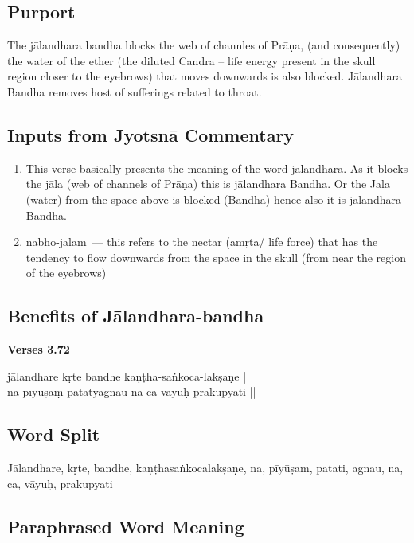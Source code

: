 \subsection*{Purport}

The jālandhara bandha blocks the web of channles of Prāṇa, (and consequently) the water of the ether (the diluted Candra – life energy present in the skull region closer to the eyebrows) that moves downwards is also blocked. Jālandhara Bandha removes host of sufferings related to throat.

\subsection*{Inputs from Jyotsnā Commentary}

\begin{enumerate}
\item This verse basically presents the meaning of the word jālandhara. As it blocks the jāla (web of channels of Prāṇa) this is jālandhara Bandha. Or the Jala (water) from the space above is blocked (Bandha) hence also it is jālandhara Bandha.
\item nabho-jalam --- this refers to the nectar (amṛta/ life force) that has the tendency to flow downwards from the space in the skull (from near the region of the eyebrows)
\end{enumerate}

\subsection*{Benefits of Jālandhara-bandha}

\noindent \textbf{Verses 3.72}

\begin{shloka}
jālandhare kṛte bandhe kaṇṭha-saṅkoca-lakṣaṇe |\\
na pīyūṣaṃ patatyagnau na ca vāyuḥ prakupyati ||
\end{shloka}

\subsection*{Word Split}

Jālandhare, kṛte, bandhe, kaṇṭhasaṅkocalakṣaṇe, na, pīyūṣam, patati, agnau, na, ca, vāyuḥ, prakupyati

\subsection*{Paraphrased Word Meaning}

